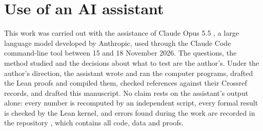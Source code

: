 \documentclass[11pt]{amsart}
\theoremstyle{definition}
\theoremstyle{remark}
\begin{document}
\section*{Use of an AI assistant}
This work was carried out with the assistance of Claude Opus 5.5 \cite{Claude}, a large language model developed by Anthropic, used through the Claude Code command-line tool between 15 and 18 November 2026. The questions, the method studied and the decisions about what to test are the author's. Under the author's direction, the assistant wrote and ran the computer programs, drafted the Lean proofs and compiled them, checked references against their Crossref records, and drafted this manuscript. No claim rests on the assistant's output alone: every number is recomputed by an independent script, every formal result is checked by the Lean kernel, and errors found during the work are recorded in the repository \cite{Repo}, which contains all code, data and proofs.



\end{document}

